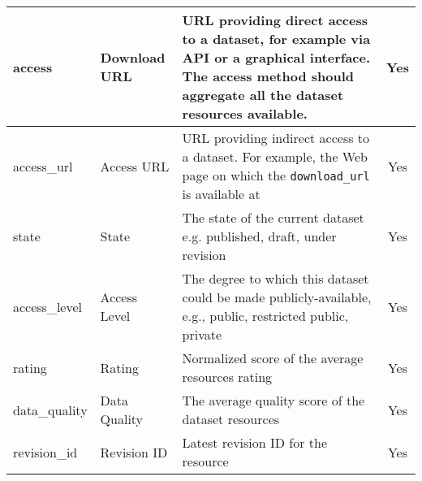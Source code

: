 \begin{center}
{\begin{longtable}[h]{|l|p{2cm}|p{9cm}|c|}
\endlastfoot
access                            & Download URL                     & URL providing direct access to a dataset, for example via API or a graphical interface. The access method should aggregate all the dataset resources available.                                                         & Yes                                 \\ \hline
access\_url                       & Access URL                       & URL providing indirect access to a dataset. For example, the Web page on which the \texttt{download\_url} is available at                                                                                             & Yes                                 \\ \hline
state                             & State                            & The state of the current dataset e.g. published, draft, under revision                                                                                                                                                  & Yes                                 \\ \hline
access\_level                     & Access Level                     & The degree to which this dataset could be made publicly-available, e.g., public, restricted public, private                                                                                                             & Yes                                 \\ \hline
rating                            & Rating                           & Normalized score of the average resources rating                                                                                                                                                                        & Yes                                 \\ \hline
data\_quality                     & Data Quality                     & The average quality score of the dataset resources                                                                                                                                                                      & Yes                                 \\ \hline
revision\_id                      & Revision ID                      & Latest revision ID for the resource                                                                                                                                                                                     & Yes                                 \\ \hline

\end{longtable}}
\end{center}
